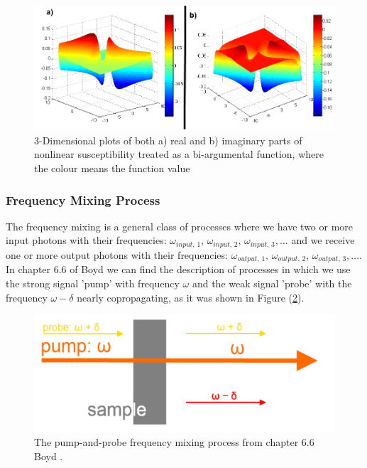 \documentclass[12pt,twoside,a4paper]{article}
\numberwithin{equation}{subsection}
\numberwithin{figure}{subsection}
\begin{document}
\begin{figure} 
  \includegraphics[width=150mm]{img/pnp_3d.png}
  \caption{3-Dimensional plots of both a) real and b) imaginary parts of nonlinear susceptibility treated as a bi-argumental function, where the colour means the function value \label{fig:physical_pnp_3d}}
\end{figure}


\subsubsection*{Frequency Mixing Process} \label{chap:physical_fm}

The frequency mixing is a general class of processes where we have two or more input photons with their frequencies: ${\omega_{input, \,1}}, \,{\omega_{input, \,2}}, \,{\omega_{input, \,3}}, \ldots $ and we receive one or more output photons with their frequencies: ${\omega_{output, \,1}}, \,{\omega_{output,\,2}}, \,{\omega_{output, \,3}}, \ldots $. In chapter 6.6 of Boyd \cite{boyd_nlo} we can find the description of processes in which we use the strong signal 'pump' with frequency $\omega$ and the weak signal 'probe' with the frequency $\omega  - \delta $ nearly copropagating, as it was shown in Figure (\ref{fig:fmix_sch}).

\begin{figure}
	\begin{center}
		\includegraphics{img/fmix_sch.png}
  		\caption{The pump-and-probe frequency mixing process from chapter 6.6 Boyd \cite{boyd_nlo}. \label{fig:fmix_sch}}
	\end{center}
\end{figure}
\end{document}
